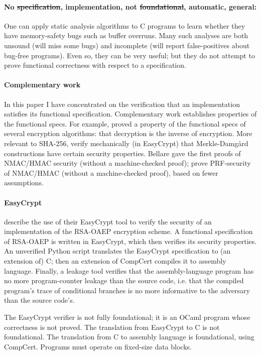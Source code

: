 \documentclass[prodmode,acmtoplas]{acmsmall}
\begin{document}
\paragraph{No \st{specification}, implementation, not \st{foundational}, automatic, general:}
One can apply static analysis algorithms to C programs to learn whether
they have memory-safety bugs such as buffer overruns.  Many such analyses
are both unsound (will miss some bugs) and incomplete (will report
false-positives about bug-free programs).  Even so, they can be very useful;
but they do not attempt to prove functional correctness with respect
to a specification.

\paragraph{Complementary work}
In this paper I have concentrated on the verification that an
implementation satisfies its functional specification.  
Complementary work establishes properties of the functional specs.
For example, 
proved a property of the functional specs of several encryption algorithms:
that decryption is the inverse of encryption.
More relevant to SHA-256,  verify mechanically
(in EasyCrypt) that Merkle-Damg{\aa}rd constructions have certain 
security properties.
Bellare \citeyear{bellare1996keying,bellare2006new}
gave the first proofs of NMAC\-/\-HMAC security 
 (without a machine-checked proof);
prove PRF-security of NMAC\-/\-HMAC (without a machine-checked proof),
based on fewer assumptions.

\paragraph{EasyCrypt}
 describe the use of their EasyCrypt tool
to verify the security of an implementation of the RSA-OAEP encryption scheme.
A functional specification of RSA-OAEP is written in EasyCrypt, which then verifies its
security properties.  An unverified Python script translates the EasyCrypt 
specification to (an extension of) C; then 
an extension of CompCert compiles it to assembly language.  Finally,
a leakage tool verifies that the assembly-language program has no more
program-counter leakage than the source code, i.e. that the compiled
program's trace of conditional branches is no more informative to the adversary
than the source code's.

The EasyCrypt verifier is not fully foundational; it is an OCaml program
whose correctness is not proved.  The translation from EasyCrypt to C is
not foundational.  The translation
from C to assembly language is foundational, using CompCert.
Programs must operate on fixed-size data blocks.
\end{document}
